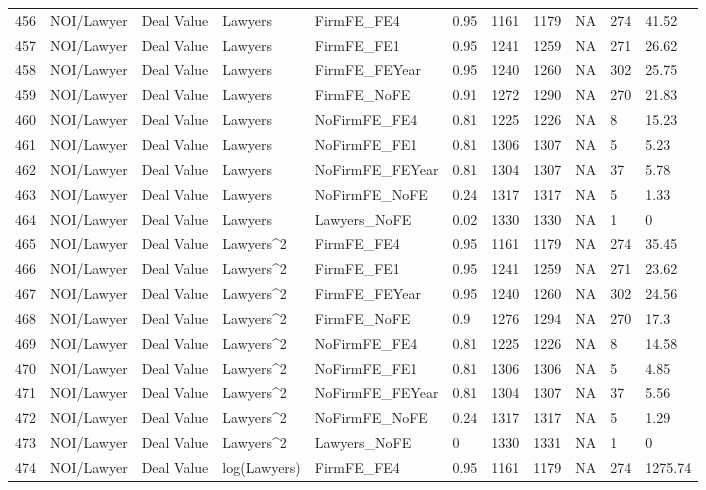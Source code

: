 \begin{table}[ht]
\begin{tabular}{rllllllllll}
  456 & NOI/Lawyer & Deal Value & Lawyers & FirmFE\_FE4 & 0.95 & 1161 & 1179 & NA & 274 & 41.52 \\ 
  457 & NOI/Lawyer & Deal Value & Lawyers & FirmFE\_FE1 & 0.95 & 1241 & 1259 & NA & 271 & 26.62 \\ 
  458 & NOI/Lawyer & Deal Value & Lawyers & FirmFE\_FEYear & 0.95 & 1240 & 1260 & NA & 302 & 25.75 \\ 
  459 & NOI/Lawyer & Deal Value & Lawyers & FirmFE\_NoFE & 0.91 & 1272 & 1290 & NA & 270 & 21.83 \\ 
  460 & NOI/Lawyer & Deal Value & Lawyers & NoFirmFE\_FE4 & 0.81 & 1225 & 1226 & NA & 8 & 15.23 \\ 
  461 & NOI/Lawyer & Deal Value & Lawyers & NoFirmFE\_FE1 & 0.81 & 1306 & 1307 & NA & 5 & 5.23 \\ 
  462 & NOI/Lawyer & Deal Value & Lawyers & NoFirmFE\_FEYear & 0.81 & 1304 & 1307 & NA & 37 & 5.78 \\ 
  463 & NOI/Lawyer & Deal Value & Lawyers & NoFirmFE\_NoFE & 0.24 & 1317 & 1317 & NA & 5 & 1.33 \\ 
  464 & NOI/Lawyer & Deal Value & Lawyers & Lawyers\_NoFE & 0.02 & 1330 & 1330 & NA & 1 & 0 \\ 
  465 & NOI/Lawyer & Deal Value & Lawyers^2 & FirmFE\_FE4 & 0.95 & 1161 & 1179 & NA & 274 & 35.45 \\ 
  466 & NOI/Lawyer & Deal Value & Lawyers^2 & FirmFE\_FE1 & 0.95 & 1241 & 1259 & NA & 271 & 23.62 \\ 
  467 & NOI/Lawyer & Deal Value & Lawyers^2 & FirmFE\_FEYear & 0.95 & 1240 & 1260 & NA & 302 & 24.56 \\ 
  468 & NOI/Lawyer & Deal Value & Lawyers^2 & FirmFE\_NoFE & 0.9 & 1276 & 1294 & NA & 270 & 17.3 \\ 
  469 & NOI/Lawyer & Deal Value & Lawyers^2 & NoFirmFE\_FE4 & 0.81 & 1225 & 1226 & NA & 8 & 14.58 \\ 
  470 & NOI/Lawyer & Deal Value & Lawyers^2 & NoFirmFE\_FE1 & 0.81 & 1306 & 1306 & NA & 5 & 4.85 \\ 
  471 & NOI/Lawyer & Deal Value & Lawyers^2 & NoFirmFE\_FEYear & 0.81 & 1304 & 1307 & NA & 37 & 5.56 \\ 
  472 & NOI/Lawyer & Deal Value & Lawyers^2 & NoFirmFE\_NoFE & 0.24 & 1317 & 1317 & NA & 5 & 1.29 \\ 
  473 & NOI/Lawyer & Deal Value & Lawyers^2 & Lawyers\_NoFE & 0 & 1330 & 1331 & NA & 1 & 0 \\ 
  474 & NOI/Lawyer & Deal Value & log(Lawyers) & FirmFE\_FE4 & 0.95 & 1161 & 1179 & NA & 274 & 1275.74 \\ 

\end{tabular}
\end{table}
